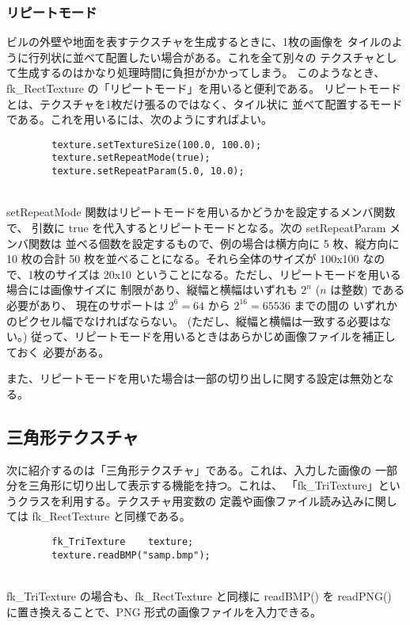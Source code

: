 \subsubsection{リピートモード}
ビルの外壁や地面を表すテクスチャを生成するときに、1枚の画像を
タイルのように行列状に並べて配置したい場合がある。これを全て別々の
テクスチャとして生成するのはかなり処理時間に負担がかかってしまう。
このようなとき、fk\_RectTexture の「リピートモード」を用いると便利である。
リピートモードとは、テクスチャを1枚だけ張るのではなく、タイル状に
並べて配置するモードである。これを用いるには、次のようにすればよい。
\\
\begin{screen}
\begin{verbatim}
        texture.setTextureSize(100.0, 100.0);
        texture.setRepeatMode(true);
        texture.setRepeatParam(5.0, 10.0);
\end{verbatim}
\end{screen}
~ \\
setRepeatMode 関数はリピートモードを用いるかどうかを設定するメンバ関数で、
引数に true を代入するとリピートモードとなる。次の setRepeatParam メンバ関数は
並べる個数を設定するもので、例の場合は横方向に 5 枚、縦方向に 10 枚の合計
50 枚を並べることになる。それら全体のサイズが 100x100 なので、1枚のサイズは
20x10 ということになる。ただし、リピートモードを用いる場合には画像サイズに
制限があり、縦幅と横幅はいずれも \(2^n\) (\(n\) は整数) である必要があり、
現在のサポートは \(2^{6} = 64\) から \(2^{16} = 65536\) までの間の
いずれかのピクセル幅でなければならない。
(ただし、縦幅と横幅は一致する必要はない。)
従って、リピートモードを用いるときはあらかじめ画像ファイルを補正しておく
必要がある。

また、リピートモードを用いた場合は一部の切り出しに関する設定は無効となる。

\subsection{三角形テクスチャ}
次に紹介するのは「三角形テクスチャ」である。これは、入力した画像の
一部分を三角形に切り出して表示する機能を持つ。これは、
「fk\_TriTexture」というクラスを利用する。テクスチャ用変数の
定義や画像ファイル読み込みに関しては fk\_RectTexture と同様である。
\\
\begin{screen}
\begin{verbatim}
        fk_TriTexture    texture;
        texture.readBMP("samp.bmp");
\end{verbatim}
\end{screen}
~ \\
fk\_TriTexture の場合も、fk\_RectTexture と同様に readBMP() を
readPNG() に置き換えることで、PNG 形式の画像ファイルを入力できる。

